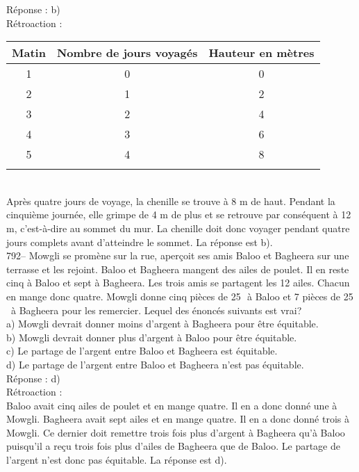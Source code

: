 ﻿\documentclass[letterpaper, 12pt]{article}
\begin{document}
R\'eponse : b)\\

R\'etroaction : \\

\begin{tabular}{|c|c|c|} \hline
{\bf Matin} & {\bf Nombre de jours voyag\'es} & {\bf Hauteur en m\`etres} \\
\hline \hline

1 & 0 & 0 \\ \hline
2 & 1 & 2\\ \hline
3 & 2 & 4\\ \hline
4 & 3 & 6\\ \hline
5 & 4 & 8\\ \hline
\multicolumn{3}{c}{}\\

\end{tabular}\\

Apr\`es quatre jours de voyage, la chenille se trouve \`a 8 m de haut.
Pendant la cinqui\`eme journ\'ee, elle grimpe de 4 m de plus et se retrouve
par cons\'equent \`a 12 m, c'est-\`a-dire au sommet du mur.  La chenille
doit donc voyager pendant quatre jours complets avant d'atteindre le sommet.
  La r\'eponse est b).\\

792-- Mowgli se prom\`ene sur la rue, aper\c coit ses amis Baloo et Bagheera
sur une terrasse et les rejoint.  Baloo et Bagheera mangent des ailes de
poulet.  Il en reste cinq \`a Baloo et sept \`a Bagheera.  Les trois amis se
partagent les 12 ailes.  Chacun en mange donc quatre.  Mowgli donne cinq
pi\`eces de 25\,\cent \ \`a Baloo et 7 pi\`eces de 25\,\cent \ \`a Bagheera
pour les remercier.  Lequel des \'enonc\'es suivants est vrai?\\
a) Mowgli devrait donner moins d'argent \`a Bagheera pour \^etre
\'equitable.\\
b) Mowgli devrait donner plus d'argent \`a Baloo pour \^etre \'equitable.\\
c) Le partage de l'argent entre Baloo et Bagheera est \'equitable.\\
d) Le partage de l'argent entre Baloo et Bagheera n'est pas \'equitable.\\

R\'eponse : d)\\

R\'etroaction : \\
Baloo avait cinq ailes de poulet et en mange quatre.  Il en a donc donn\'e
une \`a Mowgli.  Bagheera avait sept ailes et en mange quatre.  Il en a donc
donn\'e trois \`a Mowgli.  Ce dernier doit remettre trois fois plus d'argent
\`a Bagheera qu'\`a Baloo puisqu'il a re\c cu trois fois plus d'ailes de
Bagheera que de Baloo.  Le partage de l'argent n'est donc pas \'equitable.
La r\'eponse est d).\\
\end{document}
